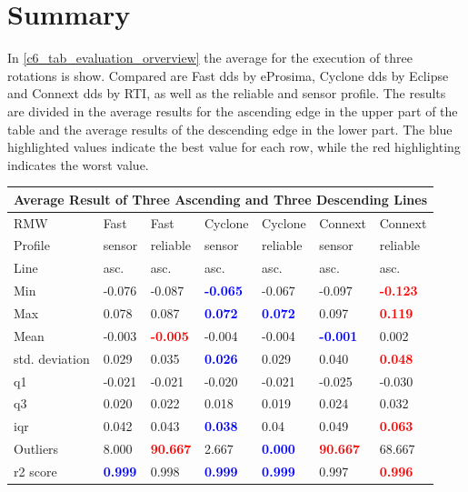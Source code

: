 \section{Summary}
In \autoref{c6_tab_evaluation_orverview} the average for the execution of three rotations is show. Compared are Fast \gls{dds} by eProsima, Cyclone \gls{dds} by Eclipse and Connext \gls{dds} by RTI, as well as the reliable and sensor profile. The results are divided in the average results for the ascending edge in the upper part of the table and the average results of the descending edge in the lower part. The blue highlighted values indicate the best value for each row, while the red highlighting indicates the worst value.
\begin{table}[htbp]
\begin{tabular}{|l|ll|ll|ll|}
\toprule
\multicolumn{7}{|c|}{Average Result of Three Ascending and Three Descending Lines} \\
\toprule
 RMW & Fast & Fast  & Cyclone & Cyclone & Connext & Connext \\
\midrule
Profile & sensor & reliable & sensor & reliable & sensor & reliable \\
\midrule
Line & asc. & asc. & asc. & asc. & asc. & asc. \\
Min & -0.076 & -0.087 & \textcolor{blue}{\textbf{-0.065}} & -0.067 & -0.097 & \textcolor{red}{\textbf{-0.123}} \\
Max & 0.078 & 0.087 & \textcolor{blue}{\textbf{0.072}} & \textcolor{blue}{\textbf{0.072}} & 0.097 & \textcolor{red}{\textbf{0.119}} \\
Mean & -0.003 & \textcolor{red}{\textbf{-0.005}} & -0.004 & -0.004 & \textcolor{blue}{\textbf{-0.001}} & 0.002 \\
std. deviation & 0.029 & 0.035 & \textcolor{blue}{\textbf{0.026}} & 0.029 & 0.040 & \textcolor{red}{\textbf{0.048}} \\
\gls{q1} & -0.021 & -0.021 & -0.020 & -0.021 & -0.025 & -0.030 \\
\gls{q3} & 0.020 & 0.022 & 0.018 & 0.019 & 0.024 & 0.032 \\
\gls{iqr} & 0.042 & 0.043 & \textcolor{blue}{\textbf{0.038}} & 0.04 & 0.049 & \textcolor{red}{\textbf{0.063}} \\
Outliers & 8.000 & \textcolor{red}{\textbf{90.667}} & 2.667 & \textcolor{blue}{\textbf{0.000}} & \textcolor{red}{\textbf{90.667}} & 68.667 \\
\gls{r2} score & \textcolor{blue}{\textbf{0.999}} & 0.998 & \textcolor{blue}{\textbf{0.999}} & \textcolor{blue}{\textbf{0.999}} & 0.997 & \textcolor{red}{\textbf{0.996}} \\

\end{tabular}
\end{table}
